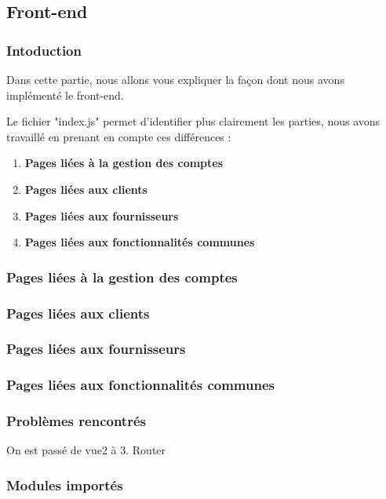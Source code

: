 \subsection{Front-end}
\subsubsection{Intoduction}
\begin{flushleft}
Dans cette partie, nous allons vous expliquer la façon dont nous avons implémenté le front-end.
\end{flushleft}
\begin{flushleft}
Le fichier "index.js" permet d'identifier plus clairement les parties, nous avons travaillé en prenant en compte ces différences : 
\end{flushleft}
\begin{enumerate}[-]
\item \textbf{Pages liées à la gestion des comptes}
\item \textbf{Pages liées aux clients}
\item \textbf{Pages liées aux fournisseurs}
\item \textbf{Pages liées aux fonctionnalités communes}
\end{enumerate} 
\newpage
\subsubsection{Pages liées à la gestion des comptes}

\subsubsection{Pages liées aux clients}

\subsubsection{Pages liées aux fournisseurs}

\subsubsection{Pages liées aux fonctionnalités communes}

\subsubsection{Problèmes rencontrés}
On est passé de vue2 à 3.
Router

\subsubsection{Modules importés}
